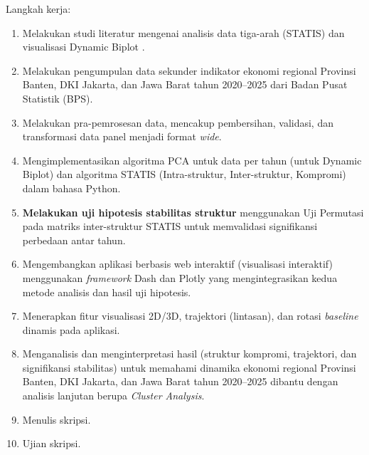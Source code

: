 \documentclass[a4paper]{article}
\theoremstyle{definition} %
\begin{document}
Langkah kerja:
\begin{enumerate}
	\item Melakukan studi literatur mengenai analisis data tiga-arah (STATIS) \citep{lavit94, oliveira2024} dan visualisasi Dynamic Biplot \citep{egido2015}.
	\item Melakukan pengumpulan data sekunder indikator ekonomi regional Provinsi Banten, DKI Jakarta, dan Jawa Barat tahun 2020--2025 dari Badan Pusat Statistik (BPS).
	\item Melakukan pra-pemrosesan data, mencakup pembersihan, validasi, dan transformasi data panel menjadi format \textit{wide}.
	\item Mengimplementasikan algoritma PCA untuk data per tahun (untuk Dynamic Biplot) dan algoritma STATIS (Intra-struktur, Inter-struktur, Kompromi) dalam bahasa Python.
    \item \textbf{Melakukan uji hipotesis stabilitas struktur} menggunakan Uji Permutasi pada matriks inter-struktur STATIS \citep{kazi1995} untuk memvalidasi signifikansi perbedaan antar tahun.
	\item Mengembangkan aplikasi berbasis web interaktif (visualisasi interaktif) menggunakan \textit{framework} Dash dan Plotly yang mengintegrasikan kedua metode analisis dan hasil uji hipotesis.
	\item Menerapkan fitur visualisasi 2D/3D, trajektori (lintasan), dan rotasi \textit{baseline} dinamis pada aplikasi.
	\item Menganalisis dan menginterpretasi hasil (struktur kompromi, trajektori, dan signifikansi stabilitas) untuk memahami dinamika ekonomi regional Provinsi Banten, DKI Jakarta, dan Jawa Barat tahun 2020--2025 dibantu dengan analisis lanjutan berupa \textit{Cluster Analysis}.
	\item Menulis skripsi.
	\item Ujian skripsi.
\end{enumerate}
\end{document}
